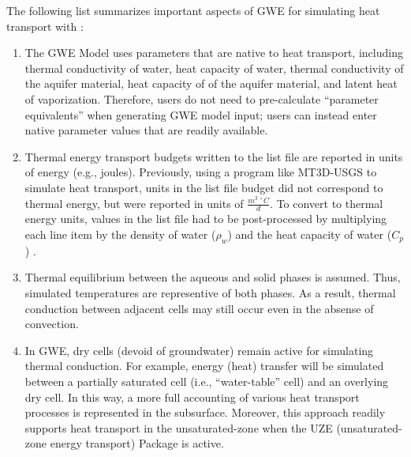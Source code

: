 The following list summarizes important aspects of GWE for simulating heat transport with \mf:

\begin{enumerate}

\item The GWE Model uses parameters that are native to heat transport, including thermal conductivity of water, heat capacity of water, thermal conductivity of the aquifer material, heat capacity of of the aquifer material, and latent heat of vaporization. Therefore, users do not need to pre-calculate ``parameter equivalents'' when generating GWE model input; users can instead enter native parameter values that are readily available.

\item Thermal energy transport budgets written to the \mf list file are reported in units of energy (e.g., joules).  Previously, using a program like MT3D-USGS \citep{mt3dusgs} to simulate heat transport, units in the list file budget did not correspond to thermal energy, but were reported in units of $\frac{m^{3 \;\circ}C}{d}$. To convert to thermal energy units, values in the list file had to be post-processed by multiplying each line item by the density of water ($\rho_w$) and the heat capacity of water ($C_p$) \citep{langevin2008seawat}.

\item Thermal equilibrium between the aqueous and solid phases is assumed.  Thus, simulated temperatures are representive of both phases.  As a result, thermal conduction between adjacent cells may still occur even in the absense of convection.  

\item In GWE, dry cells (devoid of groundwater) remain active for simulating thermal conduction. For example, energy (heat) transfer will be simulated between a partially saturated cell (i.e., ``water-table'' cell) and an overlying dry cell. In this way, a more full accounting of various heat transport processes is represented in the subsurface.  Moreover, this approach readily supports heat transport in the unsaturated-zone when the UZE (unsaturated-zone energy transport) Package is active.  


\end{enumerate}
